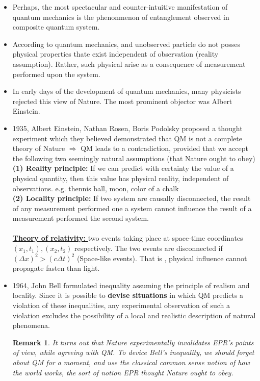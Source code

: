 \documentclass[]{article}
\newtheorem*{remark}{Remark}
\theoremstyle{nonumberplain}
\begin{document}
\begin{itemize}
	\item Perhaps, the most spectacular and counter-intuitive manifestation of quantum mechanics is the phenonmenon of entanglement observed in composite quantum system. 
	\item According to quantum mechanics, and unobserved particle do not posses physical properties thate exist independent of observation (reality assumption). Rather, such physical arise as a consequence of measurement performed upon the system.
	\item In early days of the development of quantum mechanics, many physicists rejected this view of Nature. The most prominent objector was Albert Einstein.
	\item 1935, Albert Einstein, Nathan Rosen, Boris Podolsky proposed a thought experiment which they believed demonstrated that QM is not a complete theory of Nature $\Rightarrow$ QM leads to a contradiction, provided that we accept the following two seemingly natural assumptions (that Nature ought to obey) \\
		\textbf{(1) Reality principle:}  If we can predict with certainty the value of a physical quantity, then this value has physical reality, independent of observations. e.g. thennis ball, moon, color of a chalk \\
		\textbf{(2) Locality principle:} If two system are causally disconnected, the result of any measurement performed one a system cannot influence the result of a measurement performed the second system.  \\ \\
		\underline{\textbf{Theory of relativity:} } two events taking place at space-time coordinates $(x_{1},t_{1}), (x_{2},t_{2})$ respectively. The two events are disconnected if $(\Delta x)^{2} > (c\Delta t)^{2}$ (Space-like events). That is , physical influence cannot propagate fasten than light.
	\item 1964, John Bell formulated inequality assuming the principle of realism and locality. Since it is possible to \textbf{devise situations} in which QM predicts a violation of these inequalities, any experimental observation of such a violation excludes the possibility of a local and realistic description of natural phenomena.
\begin{remark}
It turns out that Nature experimentally invalidates EPR's points of view, while agreeing with QM. To device Bell's inequality, we should forget about QM for a moment, and use the classical common sense notion of how the world works, the sort of notion EPR thought Nature ought to obey.

\end{remark}
\end{itemize}
\end{document}
